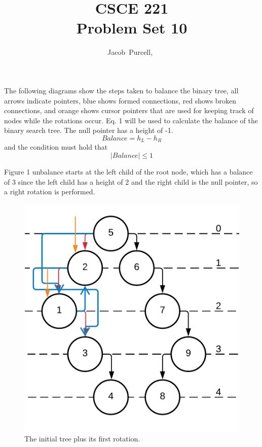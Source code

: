 \documentclass[journal]{IEEEtran}
\begin{document}
\title{CSCE 221 \\ Problem Set 10}

\author{Jacob~Purcell,~}

\maketitle
\section{}
	The following diagrams show the steps taken to balance the binary tree, all arrows indicate pointers, 
	blue shows formed connections, red shows broken connections, and orange shows cursor pointers that 
	are used for keeping track of nodes while the rotations occur. Eq. 1 will be used to calculate the 
	balance of the binary search tree. The null pointer has a height of -1. 
	\begin{equation}
		Balance = h_L - h_R
	\end{equation}
	and the condition must hold that
	\begin{equation}
		\mid Balance \mid \le 1
	\end{equation}

	Figure 1 unbalance starts at the left child of the root node, which has a balance of $3$ since the left 
	child has a height of 2 and the right child is the null pointer, so a right rotation is performed. 

\begin{figure}[h!]
	\includegraphics[scale = 0.2]{avl11.png}
	\caption{The initial tree plus its first rotation.}
\end{figure}
\end{document}
